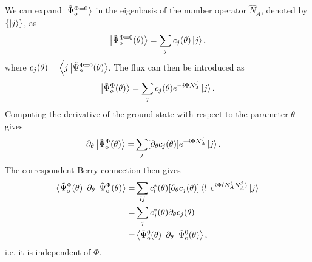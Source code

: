 \documentclass[twocolumn,amsmath,longbibliography,amssymb,superscriptaddress]{revtex4-1}
\newcommand{\brapsio}[1]{\bra{\tilde{\Psi}_{{\rm o}}^#1}}
\newcommand{\ketpsio}[1]{\ket{\tilde{\Psi}_{{\rm o}}^#1}}
\begin{document}
We can expand $\ket{\tilde{\Psi}^{\Phi = 0}_o}$ in the eigenbasis of the number operator $\hat{N}_A$, denoted by $\{\ket{j}\}$, as
\begin{equation}
\ket{\tilde{\Psi}^{\Phi = 0}_o(\theta)} = \sum_j c_j(\theta)\ket{j},
\end{equation}
where $c_j(\theta) = \Big\langle j\ket{\tilde{\Psi}^{\Phi = 0}_o(\theta)}$. The flux can then be introduced as
\begin{equation}
\ket{\tilde{\Psi}^{\Phi }_o(\theta)} = \sum_j c_j(\theta)e^{-i \Phi N_A^j}\ket{j}.
\end{equation}
Computing the derivative of the ground state with respect to the parameter $\theta$ gives
\begin{align}
\partial_\theta \ketpsio{\Phi(\theta)} =& \sum_j [\partial_\theta c_j (\theta)]e^{-i\Phi N_A^j}\ket{j}.
\end{align}
The correspondent Berry connection then gives
\begin{align}
\brapsio{\Phi(\theta)}\partial_\theta \ketpsio{\Phi(\theta)} =& \sum_{lj} c^*_l(\theta) [\partial_\theta c_j(\theta)] \bra{l} e^{i\Phi (N_A^lN_A^j)}\ket{j}\nonumber\\
=& \sum_j  c^*_j(\theta) \partial_\theta c_j(\theta) \nonumber\\
=&\brapsio{0(\theta)}\partial_\theta \ketpsio{0(\theta)}, 
\end{align}
i.e. it is independent of $\Phi$. 
\end{document}
